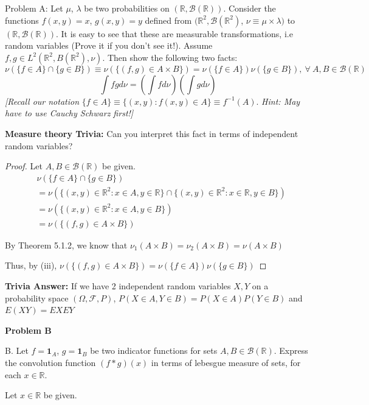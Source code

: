 \documentclass[12pt,letterpaper, onecolumn]{exam}
\newcommand{\real}{\mathbb{R}}
\newcommand{\calB}{\mathcal{B}}
\newcommand{\calF}{\mathcal{F}}
\newcommand{\borel}{\mathcal{B}(\mathbb{R})}
\newcommand{\one}{\mathbf{1}}
\begin{document}
\begin{questions}
    Problem A: Let $\mu$, $\lambda$ be two probabilities on $(\real, \borel)$. Consider the functions $f (x, y) = x$, $g(x, y) = y$ defined from $(\real^2, \calB(\real^2)$, $\nu \equiv \mu \times \lambda)$ to $(\real, \borel)$. It is easy to see that these are measurable transformations, i.e random variables (Prove it if you don’t see it!). Assume $f, g \in L^2(\real^2, B(\real^2), \nu)$. Then show the following two facts:
    \[\nu(\{f \in A\} \cap \{g \in B\}) \equiv \nu(\{(f, g) \in A \times B\}) = \nu(\{f \in A\}) \nu(\{g \in B\}), \: \forall \: A, B \in \borel\]
    \[\int fg d\nu = \left(\int f d \nu\right) \left(\int g d\nu\right)\]
    \textit{[Recall our notation} $\{f \in A\} \equiv \{(x, y) : f (x, y) \in A\} \equiv f^{-1}(A)$.
    \textit{Hint: May have to use Cauchy Schwarz first!]}
    
    \textbf{Measure theory Trivia:} Can you interpret this fact in terms of independent random variables?

    \begin{solution}
    \begin{proof}
    Let $A, B \in \borel$ be given.
    \begin{align*}
        & \nu(\{f \in A\} \cap \{g \in B\}) \\
        & = \nu(\{(x, y) \in \real^2: x \in A, y \in \real\}\cap \{(x, y) \in \real^2: x \in \real, y \in B\}) \\
        & = \nu(\{(x, y) \in \real^2: x\in A, y\in B\}) \\
        & = \nu(\{(f, g) \in A\times B\})
    \end{align*}

    By Theorem 5.1.2, we know that $\nu_1(A \times B) = \nu_2(A \times B) = \nu(A \times B)$

    Thus, by (iii), $\nu(\{(f, g) \in A\times B\}) = \nu(\{f \in A\})\nu(\{g \in B\}) $

    
    \end{proof}
    \textbf{Trivia Answer:} If we have 2 independent random variables $X, Y$ on a probability space $(\Omega, \calF, P)$, 
    $P(X\in A, Y \in B) = P(X \in A) P(Y \in B)$ and $E(XY) = EXEY$
    \end{solution}
\clearpage
    \question \textbf{Problem B}

    B. Let $f = \one_A$, $g = \one_B$ be two indicator functions for sets $A, B \in \borel$. Express the convolution function $(f * g)(x)$ in terms of lebesgue measure of sets, for each $x \in \real$.
    \begin{solution}
        Let $x \in \real$ be given. 
        

\end{solution}
\end{questions}
\end{document}
